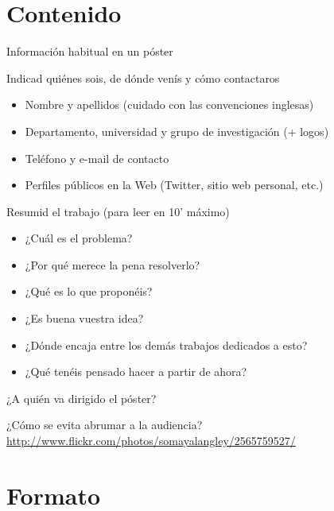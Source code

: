 \documentclass[xcolor=svgnames,compress]{beamer}
\begin{document}
\section{Contenido}

\begin{frame}{Información habitual en un póster}

  \begin{block}{Indicad quiénes sois, de dónde venís y cómo contactaros}
    \begin{itemize}
    \item Nombre y apellidos (cuidado con las convenciones inglesas)
    \item Departamento, universidad y grupo de investigación (+ logos)
    \item Teléfono y e-mail de contacto
    \item Perfiles públicos en la Web (Twitter, sitio web personal, etc.)
    \end{itemize}
  \end{block}

  \begin{block}{Resumid el trabajo (para leer en 10' máximo)}
    \begin{itemize}
    \item ¿Cuál es el problema?
    \item ¿Por qué merece la pena resolverlo?
    \item ¿Qué es lo que proponéis?
    \item ¿Es buena vuestra idea?
    \item ¿Dónde encaja entre los demás trabajos dedicados a esto?
    \item ¿Qué tenéis pensado hacer a partir de ahora?
    \end{itemize}
  \end{block}

\end{frame}

\begin{frame}{¿A quién va dirigido el póster?}
  
\end{frame}

\begin{frame}{¿Cómo se evita abrumar a la audiencia?}
  \url{http://www.flickr.com/photos/somayalangley/2565759527/}
\end{frame}

\section{Formato}
\end{document}
